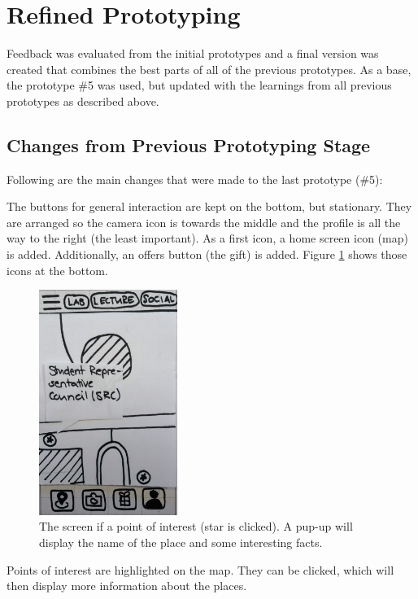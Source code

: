 \documentclass[10pt,twocolumn]{article} %
\begin{document}
\section*{Refined Prototyping}

Feedback was evaluated from the initial prototypes and a final version was created that combines the best parts of all of the previous prototypes.
As a base, the prototype \#5 was used, but updated with the learnings from all previous prototypes as described above. 


\subsection*{Changes from Previous Prototyping Stage}
Following are the main changes that were made to the last prototype (\#5): 

The buttons for general interaction are kept on the bottom, but stationary. They are arranged so the camera icon is towards the middle and the profile is all the way to the right (the least important). As a first icon, a home screen icon (map) is added. Additionally, an offers button (the gift) is added. Figure \ref{fig:map_src} shows those icons at the bottom.
 
\begin{figure}[ht]
\centering
\includegraphics[width=0.4\textwidth]{./figures/map_src.jpg}
\caption{The screen if a point of interest (star is clicked). A pup-up will display the name of the place and some interesting facts.}
\label{fig:map_src}
\end{figure}

Points of interest are highlighted on the map. They can be clicked, which will then display more information about the places.
\end{document}

